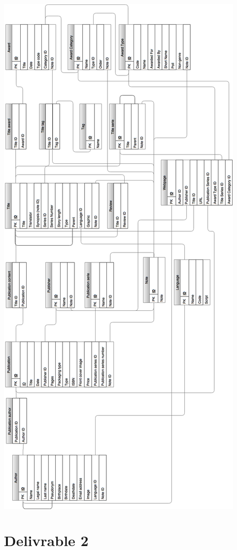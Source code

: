 \documentclass[doubleside, titlepage]{article}
\begin{document}
\begin{center}
    \includegraphics[scale = 0.33]{DBMS}
\end{center}

\newpage
\part{Delivrable 2}
\end{document}
